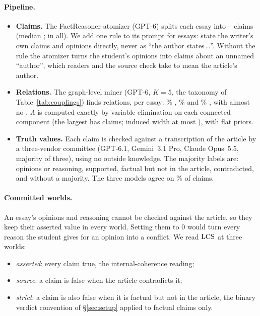\paragraph{Pipeline.}
\begin{itemize}[leftmargin=1.2em,itemsep=1pt,topsep=2pt]
\item \textbf{Claims.} The FactReasoner atomizer (GPT-6) splits each essay into
  \asapClaimsMin--\asapClaimsMax{} claims (median \asapClaimsMedian; \asapClaims{} in all). We add
  one rule to its prompt for essays: state the writer's own claims and opinions directly, never as
  ``the author states\,\ldots''. Without the rule the atomizer turns the student's opinions into
  claims about an unnamed ``author'', which readers and the source check take to mean the
  article's author.
\item \textbf{Relations.} The graph-level miner (GPT-6, $K{=}5$, the taxonomy of
  Table~\ref{tab:couplings}) finds \asapRelations{} relations, \asapRelationsMean{} per essay:
  \asapSenseEvidence\% , \asapSenseCauseEffect\%  and
  \asapSenseRestatement\% , with almost no . $\Lambda$ is
  computed exactly by variable elimination on each connected component (the largest has
  \asapLargestComp{} claims; induced width at most \asapMaxWidth), with flat priors.
\item \textbf{Truth values.} Each claim is checked against a transcription of the article by a
  three-vendor committee (GPT-6.1, Gemini~3.1 Pro, Claude Opus~5.5, majority of three), using
  no outside knowledge. The majority labels are: \asapLabOpinion{} opinions or reasoning,
  \asapLabSupported{} supported, \asapLabNotinsource{} factual but not in the article,
  \asapLabContradicted{} contradicted, and \asapLabUnresolved{} without a majority. The three
  models agree on \asapUnanimous\% of claims.
\end{itemize}

\paragraph{Committed worlds.} An essay's opinions and reasoning cannot be checked against the
article, so they keep their asserted value in every world. Setting them to $0$ would turn every
reason the student gives for an opinion into a conflict. We read $\mathrm{LCS}$ at three worlds:
\begin{itemize}[leftmargin=1.2em,itemsep=1pt,topsep=2pt]
\item \emph{asserted}: every claim true, the internal-coherence reading;
\item \emph{source}: a claim is false when the article contradicts it;
\item \emph{strict}: a claim is also false when it is factual but not in the article, the binary
  verdict convention of \S\ref{sec:setup} applied to factual claims only.
\end{itemize}

